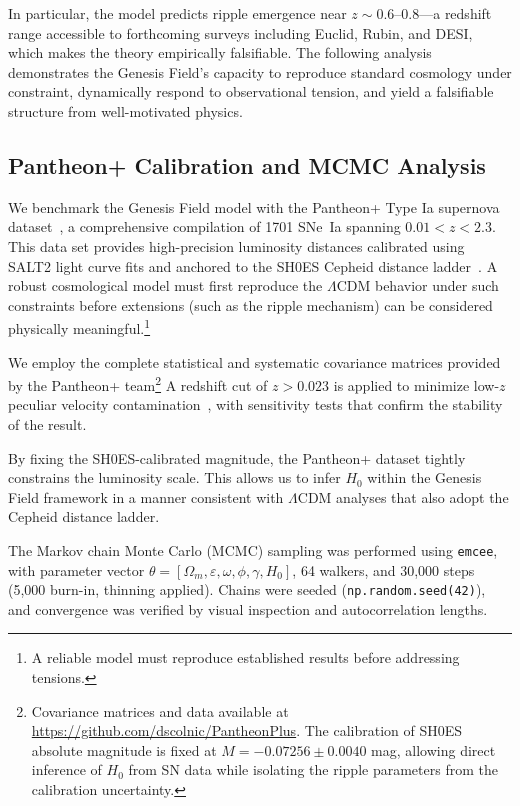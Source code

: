 In particular, the model predicts ripple emergence near $z \sim 0.6$–$0.8$—a redshift range accessible to forthcoming surveys including Euclid, Rubin, and DESI, which makes the theory empirically falsifiable. The following analysis demonstrates the Genesis Field's capacity to reproduce standard cosmology under constraint, dynamically respond to observational tension, and yield a falsifiable structure from well-motivated physics.

\subsection{Pantheon+ Calibration and MCMC Analysis}
\label{sec:pantheon}

We benchmark the Genesis Field model with the Pantheon+ Type Ia supernova dataset~\cite{Brout2022}, a comprehensive compilation of 1701 SNe~Ia spanning $0.01 < z < 2.3$. This data set provides high-precision luminosity distances calibrated using SALT2 light curve fits and anchored to the SH0ES Cepheid distance ladder~\cite{Riess2022}. A robust cosmological model must first reproduce the $\Lambda$CDM behavior under such constraints before extensions (such as the ripple mechanism) can be considered physically meaningful.\footnote{A reliable model must reproduce established results before addressing tensions.}

We employ the complete statistical and systematic covariance matrices provided by the Pantheon+ team\footnote{Covariance matrices and data available at \url{https://github.com/dscolnic/PantheonPlus}. The calibration of SH0ES absolute magnitude is fixed at $M = -0.07256 \pm 0.0040$ mag, allowing direct inference of $H_0$ from SN data while isolating the ripple parameters from the calibration uncertainty.} A redshift cut of $z > 0.023$ is applied to minimize low-$z$ peculiar velocity contamination~\cite{Scolnic2018}, with sensitivity tests that confirm the stability of the result.

By fixing the SH0ES-calibrated magnitude, the Pantheon+ dataset tightly constrains the luminosity scale. This allows us to infer $H_0$ within the Genesis Field framework in a manner consistent with $\Lambda$CDM analyses that also adopt the Cepheid distance ladder.

The Markov chain Monte Carlo (MCMC) sampling was performed using \texttt{emcee}, with parameter vector $\theta = [\Omega_m, \varepsilon, \omega, \phi, \gamma, H_0]$, 64 walkers, and 30{,}000 steps (5{,}000 burn-in, thinning applied). Chains were seeded (\texttt{np.random.seed(42)}), and convergence was verified by visual inspection and autocorrelation lengths.


